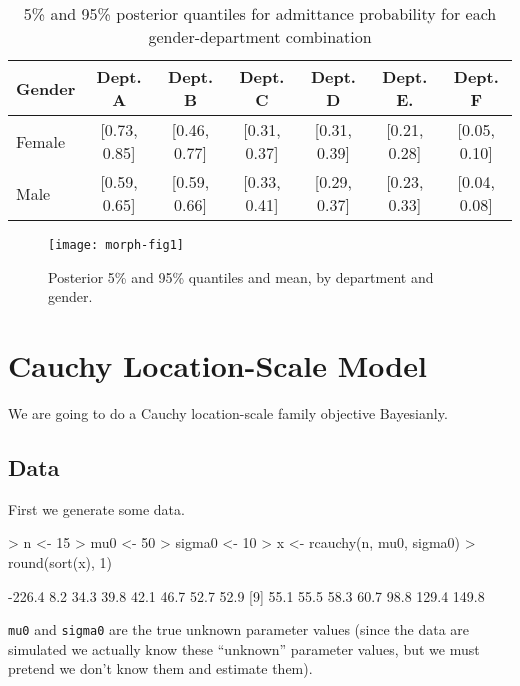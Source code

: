 \documentclass{article}
\begin{document}
\begin{table}[ht]
  \caption{5\% and 95\% posterior quantiles for admittance probability
    for each gender-department combination}
  \begin{center}
\begin{tabular}{|l|c|c|c|c|c|c|}
  \hline
 Gender & Dept. A & Dept. B & Dept. C & Dept. D & Dept. E. & Dept. F \\
 \hline
 Female & [0.73, 0.85] & [0.46, 0.77] & [0.31, 0.37] & [0.31, 0.39] & [0.21, 0.28] & [0.05, 0.10] \\
 Male & [0.59, 0.65] & [0.59, 0.66] & [0.33, 0.41] & [0.29, 0.37] & [0.23, 0.33] & [0.04, 0.08] \\
 \hline
\end{tabular}
\label{tab:post-quant}
\end{center}
\end{table}

\begin{figure}
\begin{center}
\texttt{[image: morph-fig1]}
\end{center}
\caption{Posterior 5\% and 95\% quantiles and mean, by department and gender.}
\label{fig:posterior-probs}
\end{figure}

\section{Cauchy Location-Scale Model}

We are going to do a Cauchy location-scale family objective Bayesianly.

\subsection{Data}

First we generate some data.
\begin{Schunk}
\begin{Sinput}
> n <- 15
> mu0 <- 50
> sigma0 <- 10
> x <- rcauchy(n, mu0, sigma0)
> round(sort(x), 1)
\end{Sinput}
\begin{Soutput}
 [1] -226.4    8.2   34.3   39.8   42.1   46.7   52.7   52.9
 [9]   55.1   55.5   58.3   60.7   98.8  129.4  149.8
\end{Soutput}
\end{Schunk}
\texttt{mu0} and \texttt{sigma0} are the true unknown parameter values
(since the data are simulated we actually know these ``unknown'' parameter
values, but we must pretend we don't know them and estimate them).
\end{document}
